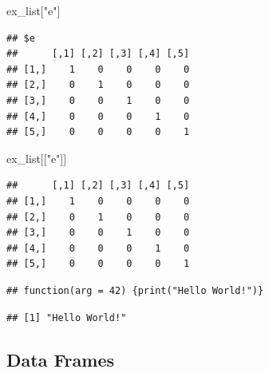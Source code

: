 \documentclass[]{book}
\newenvironment{Shaded}{\begin{snugshade}}{\end{snugshade}}
\newcommand{\KeywordTok}[1]{\textcolor[rgb]{0.13,0.29,0.53}{\textbf{#1}}}
\newcommand{\DataTypeTok}[1]{\textcolor[rgb]{0.13,0.29,0.53}{#1}}
\newcommand{\DecValTok}[1]{\textcolor[rgb]{0.00,0.00,0.81}{#1}}
\newcommand{\StringTok}[1]{\textcolor[rgb]{0.31,0.60,0.02}{#1}}
\newcommand{\OperatorTok}[1]{\textcolor[rgb]{0.81,0.36,0.00}{\textbf{#1}}}
\newcommand{\NormalTok}[1]{#1}
\theoremstyle{definition}
\theoremstyle{definition}
\theoremstyle{definition}
\theoremstyle{remark}
\begin{document}
\begin{Shaded}
\begin{Highlighting}[]
\NormalTok{ex_list[}\StringTok{"e"}\NormalTok{]}
\end{Highlighting}
\end{Shaded}

\begin{verbatim}
## $e
##      [,1] [,2] [,3] [,4] [,5]
## [1,]    1    0    0    0    0
## [2,]    0    1    0    0    0
## [3,]    0    0    1    0    0
## [4,]    0    0    0    1    0
## [5,]    0    0    0    0    1
\end{verbatim}

\begin{Shaded}
\begin{Highlighting}[]
\NormalTok{ex_list[[}\StringTok{"e"}\NormalTok{]]}
\end{Highlighting}
\end{Shaded}

\begin{verbatim}
##      [,1] [,2] [,3] [,4] [,5]
## [1,]    1    0    0    0    0
## [2,]    0    1    0    0    0
## [3,]    0    0    1    0    0
## [4,]    0    0    0    1    0
## [5,]    0    0    0    0    1
\end{verbatim}

\begin{Shaded}
\end{Shaded}

\begin{verbatim}
## function(arg = 42) {print("Hello World!")}
\end{verbatim}

\begin{Shaded}
\end{Shaded}

\begin{verbatim}
## [1] "Hello World!"
\end{verbatim}

\subsection{Data Frames}\label{dataframes}
\end{document}
